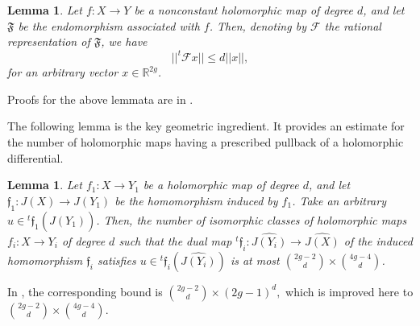 \documentclass[11pt]{article}
\numberwithin{equation}{section}
\theoremstyle{plain}
\newtheorem{lemma}[theorem]{Lemma}
\begin{document}
\vspace{0.2cm}
 \begin{lemma} \label{lem2} 
 Let $f:X\rightarrow Y$ be a nonconstant holomorphic map of degree $d$, and let $\mathfrak{F}$ be the endomorphism associated with $f$. 
 Then, denoting by $\mathcal{F}$ the rational representation of $\mathfrak{F}$, we have
\begin{equation}
||^{t}\mathcal{F}x||\le d||x||, 
\end{equation}
for an arbitrary vector $x\in\mathbb{R}^{2g}$.
\end{lemma}

Proofs for the above lemmata are in \cite{T2}.

The following lemma is the key geometric ingredient.
It provides an estimate for the number of holomorphic maps having a prescribed pullback of a holomorphic differential.
 \begin{lemma}\label{lem} Let $f_{1}:X\rightarrow Y_{1}$ be a holomorphic map of degree $d$, and let ${\mathfrak f}_{1}:J(X)\rightarrow J(Y_{1})$ be the homomorphism induced by $f_{1}$.  Take an arbitrary $u\in{^{t}{\mathfrak f}_{1}( \widehat{J(Y_{1})})}$. Then, the number of isomorphic classes of holomorphic maps $f_{i}:X\rightarrow Y_{i}$ of degree $d$ such that the dual map $^{t}{\mathfrak f}_{i}: \widehat{J(Y_{i})}\rightarrow  \widehat{J(X)}$ of the induced homomorphism ${\mathfrak f}_{i}$ satisfies $u\in{^{t}{\mathfrak f}_{i}( \widehat{J(Y_{i})})}$ is at most $\binom{2g-2}{d}\times\binom{4g-4}{d}$.
\end{lemma}
In \cite{T2}, the corresponding bound is
$\binom{2g-2}{d}\times (2g-1)^{d},
$ which is improved here to
$\binom{2g-2}{d}\times\binom{4g-4}{d}.$
\end{document}
